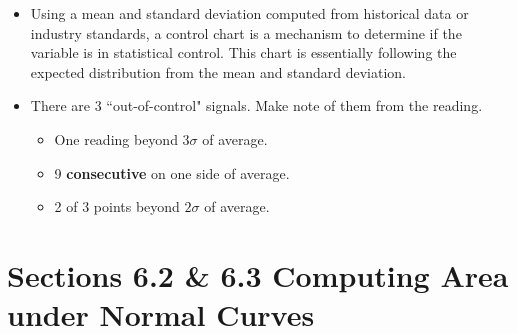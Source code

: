 \documentclass{article}
\begin{document}
\begin{enumerate}
\begin{itemize}
                \item Using a mean and standard deviation computed from historical data or industry standards, a control chart is a mechanism to determine if the variable is in statistical control. This chart is essentially following the expected distribution from the mean and standard deviation.
                
                \item There are 3 ``out-of-control" signals. Make note of them from the reading.
                
                    \begin{itemize}
                    
                        \item One reading beyond $3\sigma$ of average.
                        
                        \item 9 \textbf{consecutive} on one side of average.
                        
                        \item 2 of 3 points beyond $2\sigma$ of average.
                        
                    \end{itemize}
                    
            \end{itemize}
            
    \end{enumerate}

\newpage

\section*{Sections 6.2 \& 6.3 Computing Area under Normal Curves}
\end{document}
